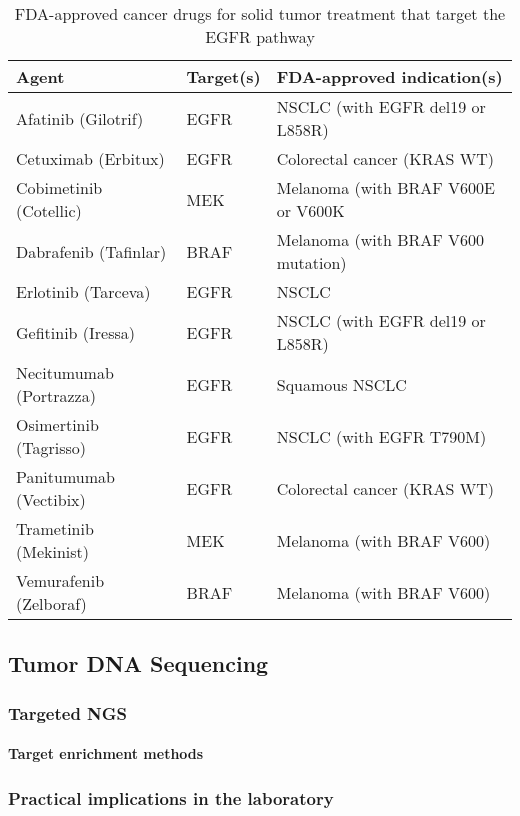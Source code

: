       \begin{table}[!htbp]
        \caption[Targeted Cancer Agents]{FDA-approved cancer drugs for solid tumor treatment that target the EGFR pathway}
        \centering
          \begin{tabular}{ |p{4cm}|p{3.7cm}|p{6.3cm}|}
          \hline
          Agent & Target(s) & FDA-approved indication(s) \\ \hline \hline
          Afatinib (Gilotrif) & EGFR & NSCLC (with EGFR del19 or L858R) \\
          Cetuximab (Erbitux) & EGFR & Colorectal cancer (KRAS WT) \\
          Cobimetinib (Cotellic) & MEK & Melanoma (with BRAF V600E or V600K \\
          Dabrafenib (Tafinlar) & BRAF & Melanoma (with BRAF V600 mutation) \\
          Erlotinib (Tarceva) & EGFR & NSCLC \\
          Gefitinib (Iressa) & EGFR & NSCLC (with EGFR del19 or L858R) \\
          Necitumumab (Portrazza) & EGFR & Squamous NSCLC \\
          Osimertinib (Tagrisso) & EGFR & NSCLC (with EGFR T790M) \\
          Panitumumab (Vectibix) & EGFR & Colorectal cancer (KRAS WT) \\
          Trametinib (Mekinist) & MEK & Melanoma (with BRAF V600) \\
          Vemurafenib (Zelboraf) & BRAF & Melanoma (with BRAF V600) \\
          \hline
        \end{tabular}
      \end{table}

  \subsection{Tumor DNA Sequencing}

    \subsubsection{Targeted NGS}

      \paragraph{Target enrichment methods}

    \subsubsection{Practical implications in the laboratory}

